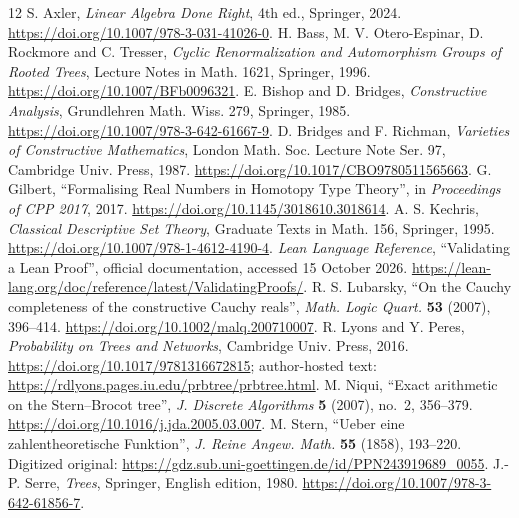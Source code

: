 \begin{thebibliography}{12}
 S. Axler, \emph{Linear Algebra Done Right}, 4th ed., Springer, 2024. \url{https://doi.org/10.1007/978-3-031-41026-0}.
 H. Bass, M. V. Otero-Espinar, D. Rockmore and C. Tresser, \emph{Cyclic Renormalization and Automorphism Groups of Rooted Trees}, Lecture Notes in Math. 1621, Springer, 1996. \url{https://doi.org/10.1007/BFb0096321}.
 E. Bishop and D. Bridges, \emph{Constructive Analysis}, Grundlehren Math. Wiss. 279, Springer, 1985. \url{https://doi.org/10.1007/978-3-642-61667-9}.
 D. Bridges and F. Richman, \emph{Varieties of Constructive Mathematics}, London Math. Soc. Lecture Note Ser. 97, Cambridge Univ. Press, 1987. \url{https://doi.org/10.1017/CBO9780511565663}.
 G. Gilbert, ``Formalising Real Numbers in Homotopy Type Theory'', in \emph{Proceedings of CPP 2017}, 2017. \url{https://doi.org/10.1145/3018610.3018614}.
 A. S. Kechris, \emph{Classical Descriptive Set Theory}, Graduate Texts in Math. 156, Springer, 1995. \url{https://doi.org/10.1007/978-1-4612-4190-4}.
 \emph{Lean Language Reference}, ``Validating a Lean Proof'', official documentation, accessed 15 October 2026. \url{https://lean-lang.org/doc/reference/latest/ValidatingProofs/}.
 R. S. Lubarsky, ``On the Cauchy completeness of the constructive Cauchy reals'', \emph{Math. Logic Quart.} \textbf{53} (2007), 396--414. \url{https://doi.org/10.1002/malq.200710007}.
 R. Lyons and Y. Peres, \emph{Probability on Trees and Networks}, Cambridge Univ. Press, 2016. \url{https://doi.org/10.1017/9781316672815}; author-hosted text: \url{https://rdlyons.pages.iu.edu/prbtree/prbtree.html}.
 M. Niqui, ``Exact arithmetic on the Stern--Brocot tree'', \emph{J. Discrete Algorithms} \textbf{5} (2007), no.~2, 356--379. \url{https://doi.org/10.1016/j.jda.2005.03.007}.
 M. Stern, ``Ueber eine zahlentheoretische Funktion'', \emph{J. Reine Angew. Math.} \textbf{55} (1858), 193--220. Digitized original: \url{https://gdz.sub.uni-goettingen.de/id/PPN243919689_0055}.
 J.-P. Serre, \emph{Trees}, Springer, English edition, 1980. \url{https://doi.org/10.1007/978-3-642-61856-7}.
\end{thebibliography}
